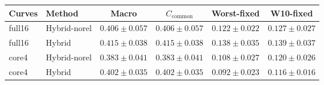 \begin{tabular}{@{}llcccc@{}}
\toprule
Curves & Method & Macro & $C_{\mathrm{common}}$ & Worst-fixed & W10-fixed \\
\midrule
full16 & Hybrid-norel & $0.406\pm0.057$ & $0.406\pm0.057$ & $0.122\pm0.022$ & $0.127\pm0.027$ \\
full16 & Hybrid & $0.415\pm0.038$ & $0.415\pm0.038$ & $0.138\pm0.035$ & $0.139\pm0.037$ \\
core4 & Hybrid-norel & $0.383\pm0.041$ & $0.383\pm0.041$ & $0.108\pm0.027$ & $0.120\pm0.026$ \\
core4 & Hybrid & $0.402\pm0.035$ & $0.402\pm0.035$ & $0.092\pm0.023$ & $0.116\pm0.016$ \\
\bottomrule
\end{tabular}
